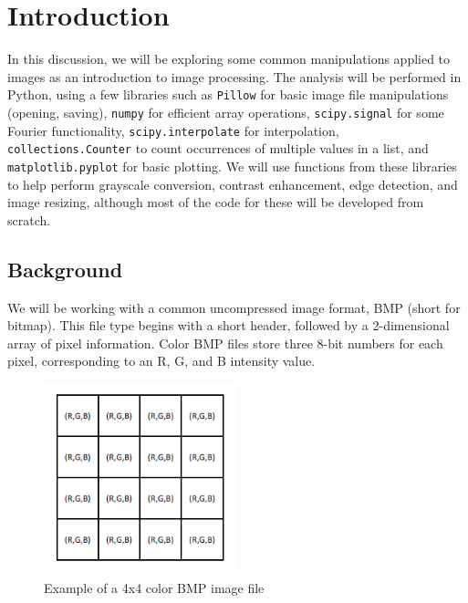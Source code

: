 \documentclass[11pt,a4paper]{article}
\begin{document}
\pagebreak

\tableofcontents

\pagebreak

\section{Introduction}
In this discussion, we will be exploring some common manipulations applied to images as an introduction to image processing. The analysis will be performed in Python, using a few libraries such as \verb|Pillow| for basic image file manipulations (opening, saving), \verb|numpy| for efficient array operations, \verb|scipy.signal| for some Fourier functionality, \verb|scipy.interpolate| for interpolation, \\ \verb|collections.Counter| to count occurrences of multiple values in a list, and \verb|matplotlib.pyplot| for basic plotting. We will use functions from these libraries to help perform grayscale conversion, contrast enhancement, edge detection, and image resizing, although most of the code for these will be developed from scratch.


\subsection{Background}
We will be working with a common uncompressed image format, BMP (short for bitmap). This file type begins with a short header, followed by a 2-dimensional array of pixel information. Color BMP files store three 8-bit numbers for each pixel, corresponding to an R, G, and B intensity value.

\begin{figure}[ht]
	\centering
	\includegraphics[width=0.5\textwidth]{figs/rgb_example}
	\caption{Example of a 4x4 color BMP image file}
	\label{fig:rgb_example}
\end{figure}
\end{document}
